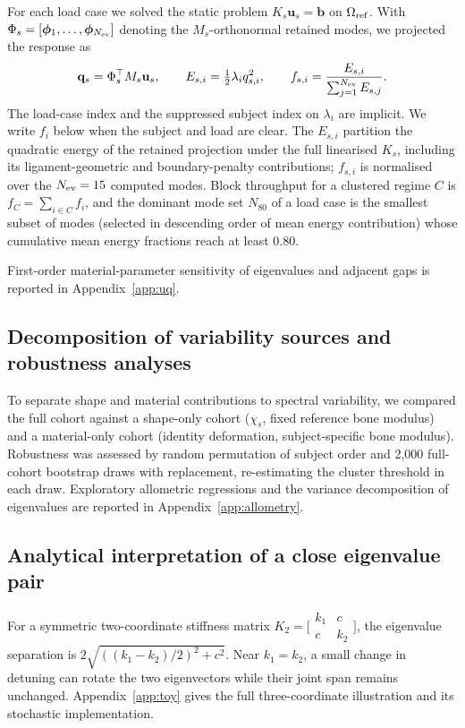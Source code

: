\documentclass[pdflatex,sn-basic]{sn-jnl}
\begin{document}
For each load case we solved the static problem $K_s\mathbf u_s=\mathbf b$ on $\Omega_{\rm ref}$. With $\Phi_s=[\boldsymbol\phi_1,\ldots,\boldsymbol\phi_{N_{\rm ev}}]$ denoting the $M_s$-orthonormal retained modes, we projected the response as
\begin{equation}
\mathbf q_s=\Phi_s^\top M_s\mathbf u_s,\qquad E_{s,i}=\tfrac12\lambda_i q_{s,i}^2,\qquad f_{s,i}=\frac{E_{s,i}}{\sum_{j=1}^{N_{\rm ev}}E_{s,j}}.
\label{eq:modal-fraction}
\end{equation}
The load-case index and the suppressed subject index on $\lambda_i$ are implicit. We write $f_i$ below when the subject and load are clear. The $E_{s,i}$ partition the quadratic energy of the retained projection under the full linearised $K_s$, including its ligament-geometric and boundary-penalty contributions; $f_{s,i}$ is normalised over the $N_{\rm ev}=15$ computed modes.
Block throughput for a clustered regime $C$ is $f_C=\sum_{i\in C}f_i$, and the dominant mode set $N_{80}$ of a load case is the smallest subset of modes (selected in descending order of mean energy contribution) whose cumulative mean energy fractions reach at least 0.80.


First-order material-parameter sensitivity of eigenvalues and adjacent gaps is reported in Appendix~\ref{app:uq}.

\subsection{Decomposition of variability sources and robustness analyses}
\label{sec:robustness-methods}

To separate shape and material contributions to spectral variability, we compared the full cohort against a shape-only cohort ($\chi_s$, fixed reference bone modulus) and a material-only cohort (identity deformation, subject-specific bone modulus).
Robustness was assessed by random permutation of subject order and 2,000 full-cohort bootstrap draws with replacement, re-estimating the cluster threshold in each draw.
Exploratory allometric regressions and the variance decomposition of eigenvalues are reported in Appendix~\ref{app:allometry}.

\subsection{Analytical interpretation of a close eigenvalue pair}
For a symmetric two-coordinate stiffness matrix $K_2=\bigl[\begin{smallmatrix}k_1&c\\c&k_2\end{smallmatrix}\bigr]$, the eigenvalue separation is $2\sqrt{((k_1-k_2)/2)^2+c^2}$. Near $k_1=k_2$, a small change in detuning can rotate the two eigenvectors while their joint span remains unchanged. Appendix~\ref{app:toy} gives the full three-coordinate illustration and its stochastic implementation.
\end{document}
